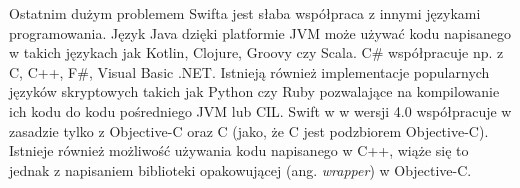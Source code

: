 \documentclass[mgr, shortabstract]{iithesis}
\newcommand{\ang}[1]{ang. \textit{#1}}
\begin{document}
Ostatnim dużym problemem Swifta jest słaba współpraca z innymi językami programowania. Język Java dzięki platformie JVM może używać kodu napisanego w takich językach jak Kotlin, Clojure, Groovy czy Scala. C\# współpracuje np. z C, C++, F\#, Visual Basic .NET. Istnieją również implementacje popularnych języków skryptowych takich jak Python czy Ruby pozwalające na kompilowanie ich kodu do kodu pośredniego JVM lub CIL. Swift w w wersji 4.0 współpracuje w zasadzie tylko z Objective-C oraz C (jako, że C jest podzbiorem Objective-C). Istnieje również możliwość używania kodu napisanego w C++, wiąże się to jednak z napisaniem biblioteki opakowującej (\ang{wrapper}) w Objective-C.


\end{document}
